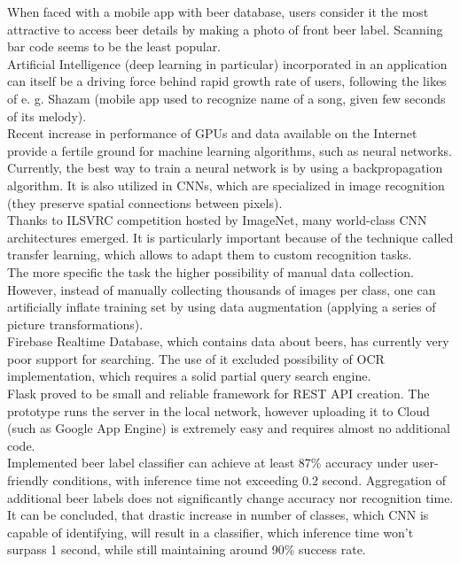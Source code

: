 \documentclass[11pt, a4paper]{article}
\begin{document}
When faced with a mobile app with beer database, users consider it the most attractive to access beer details by making a photo of front beer label. Scanning bar code seems to be the least popular.\\

Artificial Intelligence (deep learning in particular) incorporated in an application can itself be a driving force behind rapid growth rate of users, following the likes of e. g. Shazam (mobile app used to recognize name of a song, given few seconds of its melody).\\

Recent increase in performance of GPUs and data available on the Internet provide a fertile ground for machine learning algorithms, such as neural networks.\\

Currently, the best way to train a neural network is by using a backpropagation algorithm. It is also utilized in CNNs, which are specialized in image recognition (they preserve spatial connections between pixels).\\

Thanks to ILSVRC competition hosted by ImageNet, many world-class CNN architectures emerged. It is particularly important because of the technique called transfer learning, which allows to adapt them to custom recognition tasks.\\

The more specific the task the higher possibility of manual data collection. However, instead of manually collecting thousands of images per class, one can artificially inflate training set by using data augmentation (applying a series of picture transformations).\\

Firebase Realtime Database, which contains data about beers, has currently very poor support for searching. The use of it excluded possibility of OCR implementation, which requires a solid partial query search engine.\\

Flask proved to be small and reliable framework for REST API creation. The prototype runs the server in the local network, however uploading it to Cloud (such as Google App Engine) is extremely easy and requires almost no additional code. \\

Implemented beer label classifier can achieve at least 87\% accuracy under user-friendly conditions, with inference time not exceeding 0.2 second. Aggregation of additional beer labels does not significantly change accuracy nor recognition time. It can be concluded, that drastic increase in number of classes, which CNN is capable of identifying, will result in a classifier, which inference time won't surpass 1 second, while still maintaining around 90\% success rate. \\
\end{document}
